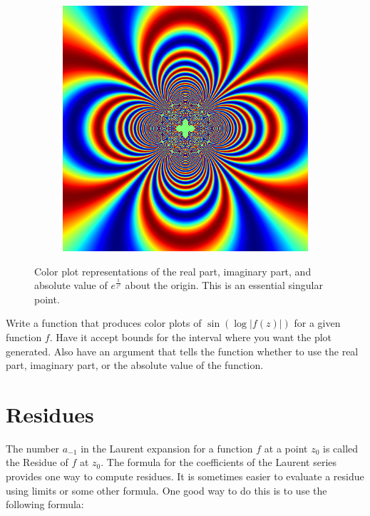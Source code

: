 \begin{figure}
\begin{subfigure}{.32\textwidth}
\end{subfigure}
\begin{subfigure}{.32\textwidth}
\includegraphics[width=\textwidth]{exp_inv2_abs.png}
\end{subfigure}
\caption{Color plot representations of the real part, imaginary part, and absolute value of $e^{\frac{1}{z^2}}$ about the origin.
This is an essential singular point.}
\label{fig:exp_inv2_color}
\end{figure}

\begin{problem}
Write a function that produces color plots of $\sin\left(\log\left|f\left(z\right)\right|\right)$ for a given function $f$.
Have it accept bounds for the interval where you want the plot generated.
Also have an argument that tells the function whether to use the real part, imaginary part, or the absolute value of the function.
\end{problem}

\section*{Residues}
The number $a_{-1}$ in the Laurent expansion for a function $f$ at a point $z_0$ is called the Residue of $f$ at $z_0$.
The formula for the coefficients of the Laurent series provides one way to compute residues.
It is sometimes easier to evaluate a residue using limits or some other formula.
One good way to do this is to use the following formula:

